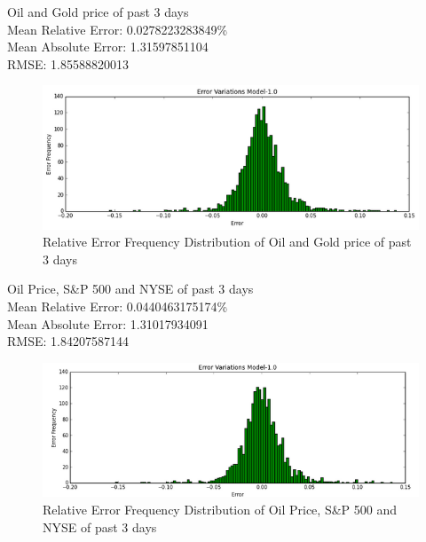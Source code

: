 \documentclass[runningheads]{llncs}
\begin{document}
Oil and Gold price of past 3 days \\ 
Mean Relative Error: 0.0278223283849\% \\
Mean Absolute Error: 1.31597851104 \\
RMSE: 1.85588820013 \\
\begin{figure}
\centering
\includegraphics[width=\textwidth]{OILGOLD_Daily.png}
\caption{Relative Error Frequency Distribution of Oil and Gold price of past 3 days}
\label{fig:OILGOLD_Daily.png}
\end{figure}

Oil Price, S\&P 500 and NYSE of past 3 days \\ 
Mean Relative Error: 0.0440463175174\% \\
Mean Absolute Error: 1.31017934091 \\
RMSE: 1.84207587144 \\
\begin{figure}
\centering
\includegraphics[width=\textwidth]{OILSP500NYSE_Daily.png}
\caption{Relative Error Frequency Distribution of Oil Price, S\&P 500 and NYSE of past 3 days}
\label{fig:OILSP500NYSE_Daily.png}
\end{figure}
\end{document}
